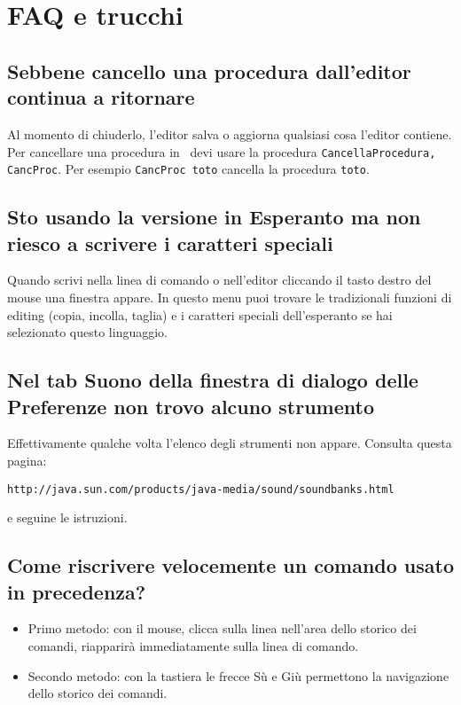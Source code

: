 \chapter{FAQ e trucchi}

\section{Sebbene cancello una procedura dall'editor continua a ritornare}
Al momento di chiuderlo, l'editor salva o aggiorna qualsiasi cosa l'editor contiene. Per cancellare una procedura in \xlogo\ devi usare la procedura \texttt{CancellaProcedura, CancProc}. Per esempio \texttt{CancProc \textquotedbl toto} cancella la procedura \texttt{toto}.


\section{Sto usando la versione in Esperanto ma non riesco a scrivere i caratteri speciali}
Quando scrivi nella linea di comando o nell'editor cliccando il tasto destro del mouse una finestra appare. In questo menu puoi trovare le tradizionali funzioni di editing (copia, incolla, taglia) e i caratteri speciali dell'esperanto se hai selezionato questo linguaggio.


\section{Nel tab Suono della finestra di dialogo delle Preferenze non trovo alcuno strumento}
Effettivamente qualche volta l'elenco degli strumenti non appare. Consulta questa pagina: 
\begin{center}
	\texttt{http://java.sun.com/products/java-media/sound/soundbanks.html}
\end{center}
e seguine le istruzioni.


\section{Come riscrivere velocemente un comando usato in precedenza?}
\begin{itemize}
	\item Primo metodo: con il mouse, clicca sulla linea nell'area dello storico dei comandi, riapparirà immediatamente sulla linea di comando.
	\item Secondo metodo: con la tastiera le frecce Sù e Giù permettono la navigazione dello storico dei comandi.
\end{itemize}


